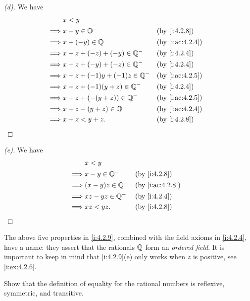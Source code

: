 \begin{proof}[(d)]
  We have
  \begin{align*}
             & x < y                                                 \\
    \implies & x - y \in \Q^-                   &  & \by{i:4.2.8}    \\
    \implies & x + (-y) \in \Q^-                &  & \by{i:ac:4.2.4} \\
    \implies & x + z + (-z) + (-y) \in \Q^-     &  & \by{i:4.2.4}    \\
    \implies & x + z + (-y) + (-z) \in \Q^-     &  & \by{i:4.2.4}    \\
    \implies & x + z + (-1) y + (-1) z \in \Q^- &  & \by{i:ac:4.2.5} \\
    \implies & x + z + (-1) (y + z) \in \Q^-    &  & \by{i:4.2.4}    \\
    \implies & x + z + (-(y + z)) \in \Q^-      &  & \by{i:ac:4.2.5} \\
    \implies & x + z - (y + z) \in \Q^-         &  & \by{i:ac:4.2.4} \\
    \implies & x + z < y + z.                   &  & \by{i:4.2.8}
  \end{align*}
\end{proof}

\begin{proof}[(e)]
  We have
  \begin{align*}
             & x < y                                  \\
    \implies & x - y \in \Q^-    &  & \by{i:4.2.8}    \\
    \implies & (x - y)z \in \Q^- &  & \by{i:ac:4.2.8} \\
    \implies & xz - yz \in \Q^-  &  & \by{i:4.2.4}    \\
    \implies & xz < yz.          &  & \by{i:4.2.8}
  \end{align*}
\end{proof}

\begin{rmk}\label{i:4.2.10}
  The above five properties in \cref{i:4.2.9}, combined with the field axioms in \cref{i:4.2.4}, have a name:
  they assert that the rationals \(\mathbb{Q}\) form an \emph{ordered field}.
  It is important to keep in mind that \cref{i:4.2.9}(e) only works when \(z\) is positive, see \cref{i:ex:4.2.6}.
\end{rmk}

\exercisesection

\begin{ex}\label{i:ex:4.2.1}
  Show that the definition of equality for the rational numbers is reflexive, symmetric, and transitive.
\end{ex}

